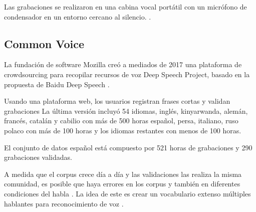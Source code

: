 Las grabaciones se realizaron en una cabina vocal portátil con un micrófono de condensador en un entorno cercano al silencio.  \cite{googleTTSLatinAmericanSpanishCorpus}.

\subsection{Common Voice}

La fundación de software Mozilla creó a mediados de 2017 una plataforma de  crowdsourcing para recopilar recursos de voz  Deep Speech Project, basado en la propuesta de Baidu Deep Speech \cite{deepspeeh}. 

Usando una plataforma web, los usuarios registran frases cortas y  validan  grabaciones  La última versión  incluyó 54 idiomas,  inglés, kinyarwanda, alemán, francés, catalán y cabilio con más de 500 horas\macb{\st{,};} español, persa, italiano, ruso polaco con más de 100 horas\macb{,} y los idiomas restantes con menos de 100 horas.

El conjunto de datos  español está compuesto por 521 horas de grabaciones y 290 grabaciones validadas.

A medida que el corpus crece día a día y las validaciones las realiza la misma comunidad, es posible que haya errores en los corpus y también en diferentes condiciones del habla . La idea de este  es crear un  vocabulario extenso múltiples hablantes para  reconocimiento de voz  \cite{Common-Voice}.


